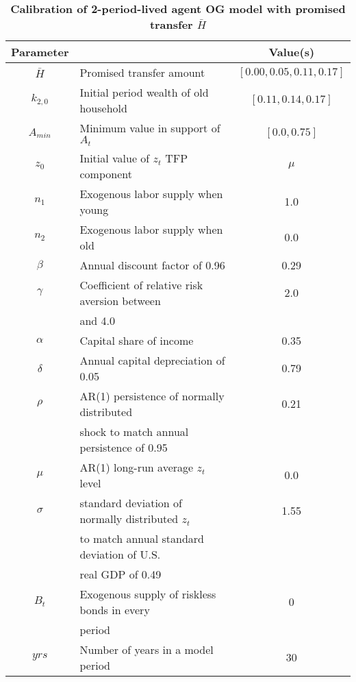 \documentclass[letterpaper,12pt]{article}
\theoremstyle{definition}
\begin{document}
\begin{spacing}{1.5}
  \begin{table}[htbp]\centering\captionsetup{width=5.6in}
  \caption{\label{TabCalibr}\textbf{Calibration of 2-period-lived agent OG model with promised transfer $\bar{H}$}}
      \begin{threeparttable}
      \begin{tabular}{>{\small}c >{\small}l >{\small}c}
          \hline\hline
          Parameter & \multicolumn{1}{c}{Source to match} & Value(s) \\
          \hline
          $\bar{H}$ & Promised transfer amount & $[0.00, 0.05, 0.11, 0.17]$ \\
          $k_{2,0}$ & Initial period wealth of old household & $[0.11, 0.14, 0.17]$ \\
          $A_{min}$ & Minimum value in support of $A_t$ & $[0.0, 0.75]$ \\
          \hline
          $z_0$ & Initial value of $z_t$ TFP component & $\mu$ \\
          $n_1$ & Exogenous labor supply when young & 1.0 \\
          $n_2$ & Exogenous labor supply when old & 0.0 \\
          $\beta$  & Annual discount factor of 0.96 & 0.29 \\
          $\gamma$ & Coefficient of relative risk aversion between &  2.0 \\
                   & \quad 1.5 and 4.0 &  \\
          $\alpha$ & Capital share of income &  0.35 \\
          $\delta$ & Annual capital depreciation of 0.05 & 0.79 \\
          $\rho$   & AR(1) persistence of normally distributed &  0.21 \\
                   & \quad shock to match annual persistence of 0.95 &       \\
          $\mu$    & AR(1) long-run average $z_t$ level &  0.0 \\
          $\sigma$ & standard deviation of normally distributed $z_t$ &  1.55 \\
                   & \quad to match annual standard deviation of U.S. &  \\
                   & \quad real GDP of 0.49 & \\
          $B_t$    & Exogenous supply of riskless bonds in every & 0 \\
                   & \quad period & \\
          \hline
          $yrs$ & Number of years in a model period & 30 \\

\end{tabular}
\end{threeparttable}
\end{table}
\end{spacing}
\end{document}
